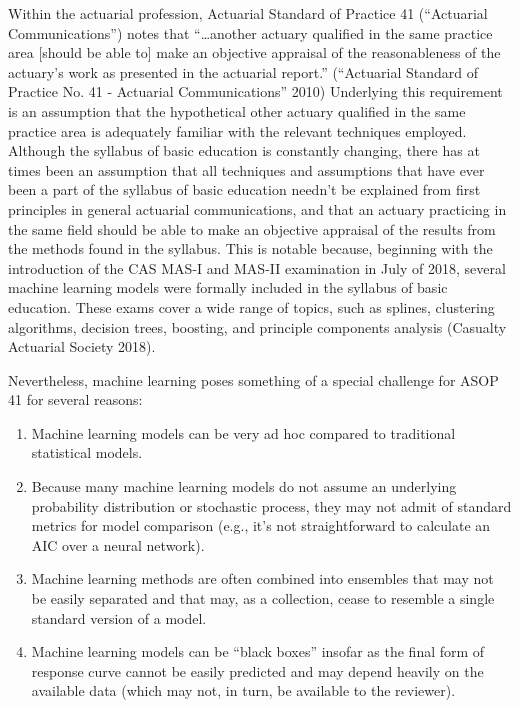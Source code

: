 \documentclass[preprint, 3p, twocolumn, letterpaper, 10pt]{elsarticle} %
\providecommand{\tightlist}{%
  \setlength{\itemsep}{0pt}\setlength{\parskip}{0pt}}
\begin{document}
Within the actuarial profession, Actuarial Standard of Practice 41 (``Actuarial
Communications'') notes that ``\ldots{}another actuary qualified in the same practice
area {[}should be able to{]} make an objective appraisal of the reasonableness of
the actuary's work as presented in the actuarial report.'' (``Actuarial Standard of Practice No. 41 - Actuarial Communications'' 2010) Underlying
this requirement is an assumption that the hypothetical other actuary qualified
in the same practice area is adequately familiar with the relevant techniques
employed. Although the syllabus of basic education is constantly changing, there
has at times been an assumption that all techniques and assumptions that have
ever been a part of the syllabus of basic education needn't be explained from
first principles in general actuarial communications, and that an actuary
practicing in the same field should be able to make an objective appraisal of
the results from the methods found in the syllabus.
This is notable because, beginning with the introduction
of the CAS MAS-I and MAS-II examination in July of 2018, several machine learning
models were formally included in the syllabus of basic education. These exams
cover a wide range of topics, such as splines, clustering algorithms, decision
trees, boosting, and principle components analysis (Casualty Actuarial Society 2018).

Nevertheless, machine learning poses something of a special challenge for ASOP
41 for several reasons:

\begin{enumerate}
\def\labelenumi{\arabic{enumi}.}
\tightlist
\item
  Machine learning models can be very ad hoc compared to
  traditional statistical models.
\item
  Because many machine learning models do not assume an underlying probability
  distribution or stochastic process, they may not admit of standard metrics for model comparison
  (e.g., it's not straightforward to calculate an AIC over a neural network).
\item
  Machine learning methods are often combined into ensembles that
  may not be easily separated and that may, as a collection, cease to resemble
  a single standard version of a model.
\item
  Machine learning models can be ``black boxes'' insofar as the final form of
  response curve cannot be easily predicted and may depend heavily on the
  available data (which may not, in turn, be available to the reviewer).
\end{enumerate}
\end{document}
